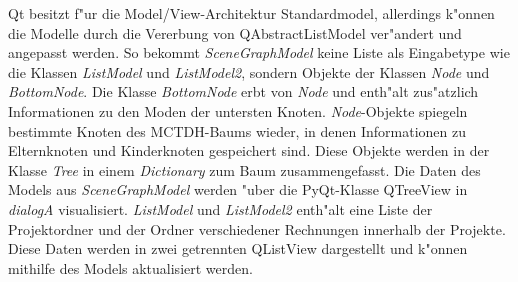Qt besitzt f"ur die Model/View-Architektur Standardmodel, allerdings k"onnen die Modelle durch die Vererbung
von QAbstractListModel ver"andert und angepasst werden. So bekommt \textit{SceneGraphModel} keine Liste als Eingabetype wie die Klassen \textit{ListModel} und
\textit{ListModel2},
sondern Objekte der Klassen \textit{Node} und \textit{BottomNode}. 
Die Klasse \textit{BottomNode} erbt von \textit{Node} und enth"alt zus"atzlich Informationen zu den Moden der untersten Knoten. 
\textit{Node}-Objekte spiegeln bestimmte Knoten des
MCTDH-Baums wieder, in denen Informationen zu Elternknoten und Kinderknoten gespeichert sind. Diese Objekte werden
in der Klasse \textit{Tree} in einem \textit{Dictionary} zum Baum zusammengefasst. 
Die Daten des Models aus \textit{SceneGraphModel} werden "uber die PyQt-Klasse QTreeView in \textit{dialogA} visualisiert.
\textit{ListModel} und \textit{ListModel2} enth"alt eine Liste der Projektordner und der Ordner verschiedener Rechnungen innerhalb der Projekte.
Diese Daten werden in zwei getrennten QListView dargestellt und k"onnen mithilfe des Models aktualisiert werden.




  




   
